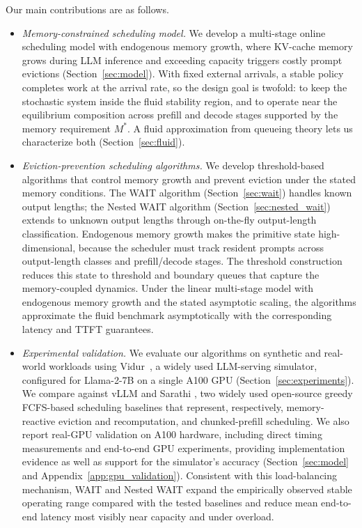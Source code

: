 Our main contributions are as follows.
\begin{itemize}
    \item \emph{Memory-constrained scheduling model.} We develop a multi-stage online scheduling model with endogenous memory growth, where KV-cache memory grows during LLM inference and exceeding capacity triggers costly prompt evictions (Section~\ref{sec:model}). With fixed external arrivals, a stable policy completes work at the arrival rate, so the design goal is twofold: to keep the stochastic system inside the fluid stability region, and to operate near the equilibrium composition across prefill and decode stages supported by the memory requirement \(M^*\). A fluid approximation from queueing theory lets us characterize both (Section~\ref{sec:fluid}).
    \item \emph{Eviction-prevention scheduling algorithms.} We develop threshold-based algorithms that control memory growth and prevent eviction under the stated memory conditions. The WAIT algorithm (Section~\ref{sec:wait}) handles known output lengths; the Nested WAIT algorithm (Section~\ref{sec:nested_wait}) extends to unknown output lengths through on-the-fly output-length classification. Endogenous memory growth makes the primitive state high-dimensional, because the scheduler must track resident prompts across output-length classes and prefill/decode stages. The threshold construction reduces this state to threshold and boundary queues that capture the memory-coupled dynamics. Under the linear multi-stage model with endogenous memory growth and the stated asymptotic scaling, the algorithms approximate the fluid benchmark asymptotically with the corresponding latency and TTFT guarantees.
    \item \emph{Experimental validation.} We evaluate our algorithms on synthetic and real-world workloads using Vidur~\citep{agrawal2024vidur}, a widely used LLM-serving simulator, configured for Llama-2-7B on a single A100 GPU (Section~\ref{sec:experiments}). We compare against vLLM \citep{kwon2023efficient} and Sarathi \citep{agrawal2023sarathi}, two widely used open-source greedy FCFS-based scheduling baselines that represent, respectively, memory-reactive eviction and recomputation, and chunked-prefill scheduling. We also report real-GPU validation on A100 hardware, including direct timing measurements and end-to-end GPU experiments, providing implementation evidence as well as support for the simulator's accuracy (Section~\ref{sec:model} and Appendix~\ref{app:gpu_validation}). Consistent with this load-balancing mechanism, WAIT and Nested WAIT expand the empirically observed stable operating range compared with the tested baselines and reduce mean end-to-end latency most visibly near capacity and under overload.
\end{itemize}
